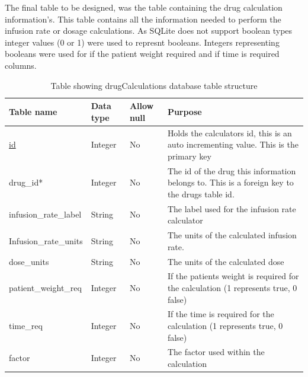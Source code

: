The final table to be designed, was the table containing the drug calculation information’s. This table contains all the information needed to perform the infusion rate or dosage calculations. As SQLite \cite{sqlite} does not support boolean types \cite{sqlite_dt} integer values (0 or 1) were used to represnt booleans. Integers representing booleans were used for if the patient weight required and if time is required columns.


\begin{center}
\begin{longtable}{|l|l|l|p{7cm}|}
\caption{Table showing drugCalculations database table structure}\tabularnewline
\hline
\textbf{Table name}   & \textbf{Data type} & \textbf{Allow null} & \textbf{Purpose} \\ \hline
\uline{id}                    & Integer            & No                  & Holds the calculators id, this is an auto incrementing value. This is the primary key        \\ \hline
drug\_id*             & Integer            & No                  & The id of the drug this information belongs to. This is a foreign key to the drugs table id. \\ \hline
infusion\_rate\_label & String             & No                  & The label used for the infusion rate calculator                                              \\ \hline
Infusion\_rate\_units & String             & No                  & The units of the calculated infusion rate.                                                   \\ \hline
dose\_units           & String             & No                  & The units of the calculated dose                                                             \\ \hline
patient\_weight\_req  & Integer            & No                  & If the patients weight is required for the calculation (1 represents true, 0 false)          \\ \hline
time\_req             & Integer            & No                  & If the time is required for the calculation (1 represents true, 0 false)                     \\ \hline
factor                & Integer            & No                  & The factor used within the calculation                                                       \\ \hline
\end{longtable}
\end{center}

